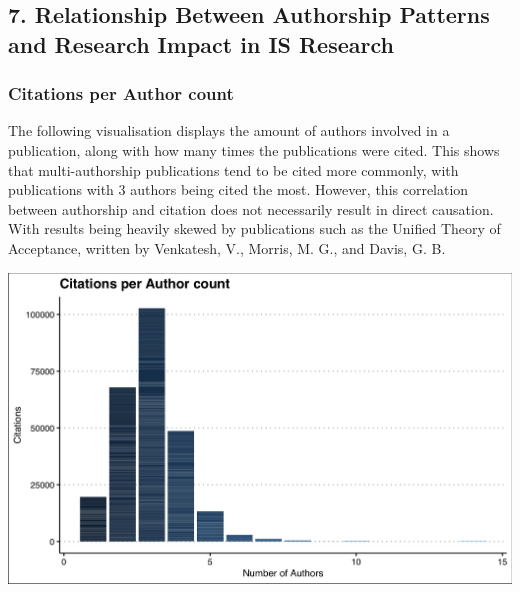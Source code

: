 \documentclass[
  letterpaper,
  DIV=11,
  numbers=noendperiod]{scrartcl}
\let\oldparagraph\paragraph
\renewcommand{\paragraph}[1]{\oldparagraph{#1}\mbox{}}
\begin{document}
\hypertarget{section}{%
\paragraph{}\label{section}}

\newpage{}

\hypertarget{relationship-between-authorship-patterns-and-research-impact-in-is-research}{%
\subsection{\texorpdfstring{7. \textbf{Relationship Between Authorship
Patterns and Research Impact in IS
Research}}{7. Relationship Between Authorship Patterns and Research Impact in IS Research}}\label{relationship-between-authorship-patterns-and-research-impact-in-is-research}}

\hypertarget{citations-per-author-count}{%
\subsubsection{Citations per Author
count}\label{citations-per-author-count}}

The following visualisation displays the amount of authors involved in a
publication, along with how many times the publications were cited. This
shows that multi-authorship publications tend to be cited more commonly,
with publications with 3 authors being cited the most. However, this
correlation between authorship and citation does not necessarily result
in direct causation. With results being heavily skewed by publications
such as the Unified Theory of Acceptance, written by Venkatesh, V.,
Morris, M. G., and Davis, G. B.

\includegraphics{images/cite_per_authship.png}
\end{document}
